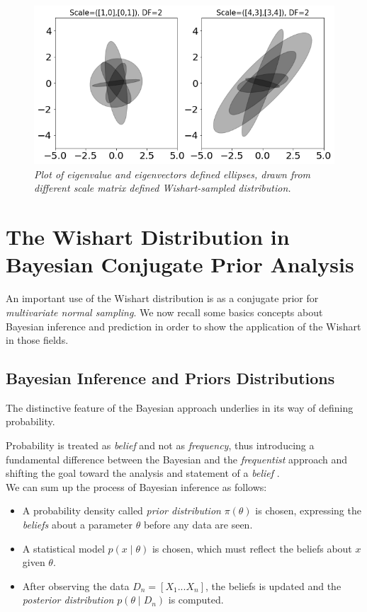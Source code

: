 \documentclass[12pt,openright,twoside,a4paper]{book}
\begin{document}
\begin{figure}[!h]
\centering
\includegraphics[scale=0.37]{wisheig-df2}
\caption{\textit{Plot of eigenvalue and eigenvectors defined ellipses, drawn from different scale matrix defined Wishart-sampled distribution. }}
\label{Wish-eig}
\end{figure}

\section{The Wishart Distribution in Bayesian Conjugate Prior Analysis}

An important use of the Wishart distribution is as a conjugate prior for \textit{multivariate normal sampling}. We now recall some basics concepts about Bayesian inference and prediction in order to show the application of the Wishart in those fields.

\subsection{Bayesian Inference and Priors Distributions}

The distinctive feature of the Bayesian approach underlies in its way of defining probability.

Probability is treated as \textit{belief} and not as \textit{frequency}, thus introducing a fundamental difference between the Bayesian and the \textit{frequentist} approach and shifting the goal toward the analysis and statement of a \textit{belief} \cite{SML}.
\\[12pt]
We can sum up the process of Bayesian inference as follows:
\begin{itemize}
\item A probability density called \textit{prior distribution} $\pi(\theta)$ is chosen, expressing the \textit{beliefs} about a parameter $\theta$ before any data are seen.
\item A statistical model $p(x\mid \theta)$ is chosen, which must reflect the beliefs about $x$ given $\theta$.
\item After observing the data $D_n=[X_1...X_n]$, the beliefs is updated and the \textit{posterior distribution} $p(\theta\mid D_n)$ is computed.
\end{itemize}
\end{document}
